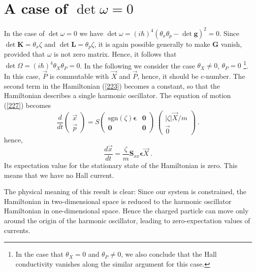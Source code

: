 \documentclass[a4paper,seceq]{ptptex}
\newcommand{\bfg}{ \boldsymbol{g} }
\newcommand{\bfG}{ \boldsymbol{G} }
\newcommand{\bfK}{ \boldsymbol{K} }
\newcommand{\bfL}{ \boldsymbol{L} }
\newcommand{\bfS}{ \boldsymbol{S} }
\newcommand{\bfeps}{\boldsymbol{\epsilon}}
\newcommand{\vecp}{ {\vec p} }
\newcommand{\vecx}{ {\vec x} }
\newcommand{\vecP}{ {\vec P} }
\newcommand{\vecX}{ {\vec X} }
\newcommand{\sgn}{{\mbox{sgn}}}
\begin{document}
\section{A case of $\det \omega = 0$}
In the case of $\det \omega = 0$ we have $\det \omega
= (i \hbar)^4 \left( \theta_x \theta_p - \det \bfg \right)^2=0$.
Since $\det \bfK = \theta_x \zeta$ and $\det \bfL = \theta_p \zeta$,
it is again possible generally to make $\bfG$ vanish,
provided that $\omega$ is not zero matrix.
Hence, it follows that $\det\Omega = (i \hbar)^4 \theta_X \theta_P =0$.
In the following we consider the case $\theta_X\neq 0$, $\theta_P=0$
\footnote{
In the case that $\theta_X =0$ and $\theta_P \ne 0$, we also
conclude that the Hall conductivity vanishes
along the similar argument for this case.
}.
In this case, $\vecP$ is commutable with $\vecX$ and $\vecP$,
hence, it should be c-number. The second term in the Hamiltonian
(\ref{223}) becomes a constant, so that the Hamiltonian describes
a single harmonic oscillator.
The equation of motion (\ref{227}) becomes
\begin{equation}
   \frac{d}{dt} \begin{pmatrix} \vecx \\ \vecp \end{pmatrix}
  = S \begin{pmatrix} \sgn(\zeta) \bfeps & \boldsymbol{0} \\
                          \boldsymbol{0} & \boldsymbol{0}
                                                      \end{pmatrix}~
   \begin{pmatrix} |\zeta| \vecX/m \\ \vec{0} \end{pmatrix}~.
\label{301}
\end{equation}
hence, 
\begin{equation}
  \frac{d \vecx}{dt} 
  = \frac{\zeta}{m} \bfS_{xx} \bfeps \vecX~.
\label{302}
\end{equation}
Its expectation value for the stationary state of the Hamiltonian
is zero. This means that we have no Hall current.

The physical meaning of this result is clear: Since
our system is constrained, the Hamiltonian in two-dimensional space
is reduced to the harmonic oscillator Hamiltonian
in one-dimensional space.
Hence the charged particle can move only around
the origin of the harmonic oscillator,
leading to zero-expectation values of currents.
\end{document}
